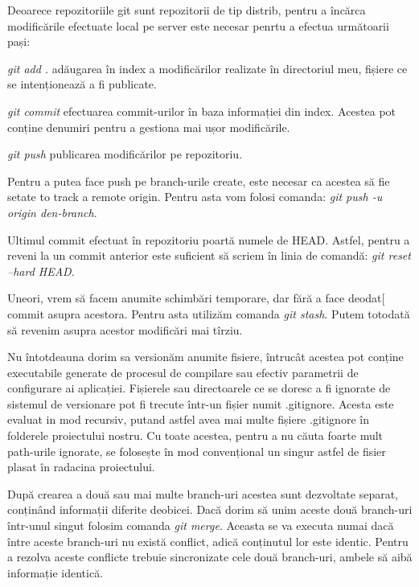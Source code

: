 	Deoarece repozitoriile git sunt repozitorii de tip distrib, pentru a încărca modificările efectuate local pe server este necesar penrtu a efectua următoarii pași:
	\begin{list}{•}
	\item  \textit{git add .} adăugarea în index a modificărilor realizate în directoriul meu, fișiere ce se intenționează a fi publicate.
	\item  \textit{git commit} efectuarea commit-urilor în baza informației din index. Acestea pot conține denumiri pentru a gestiona mai ușor modificările.
	\item \textit{git push} publicarea modificărilor pe repozitoriu.
	\end{list}
	
	Pentru a putea face push pe branch-urile create, este necesar ca acestea să fie setate to track a remote origin. Pentru asta vom folosi comanda: \textit{git push -u origin den-branch}. 
	
	Ultimul commit efectuat în repozitoriu poartă numele de HEAD. Astfel, pentru a reveni la un commit anterior este suficient să scriem în linia de comandă: \textit{git reset --hard HEAD}.
	
	Uneori, vrem să facem anumite schimbări temporare, dar fără a face deodat[ commit asupra acestora. Pentru asta utilizăm comanda \textit{git stash}. Putem totodată să revenim asupra acestor modificări mai tîrziu.
	
	Nu întotdeauna dorim sa versionăm anumite fisiere, întrucât acestea pot conține executabile generate de procesul de compilare sau efectiv parametrii de configurare ai aplicației. Fișierele sau directoarele ce se doresc a fi ignorate de sistemul de versionare pot fi trecute într-un fișier numit .gitignore. Acesta este evaluat in mod recursiv, putand astfel avea mai multe fișiere .gitignore în folderele proiectului nostru. Cu toate acestea, pentru a nu căuta foarte mult path-urile ignorate, se folosește în mod convențional un singur astfel de fisier plasat în radacina proiectului.
	
	După crearea a două sau mai multe branch-uri acestea sunt dezvoltate separat, conținând informații diferite deobicei. Dacă dorim să unim aceste două branch-uri într-unul singut folosim comanda \textit{git merge}. Aceasta se va executa numai dacă între aceste branch-uri nu există conflict, adică conținutul lor este identic. Pentru a rezolva aceste conflicte trebuie sincronizate cele două branch-uri, ambele să aibă informație identică.
	
